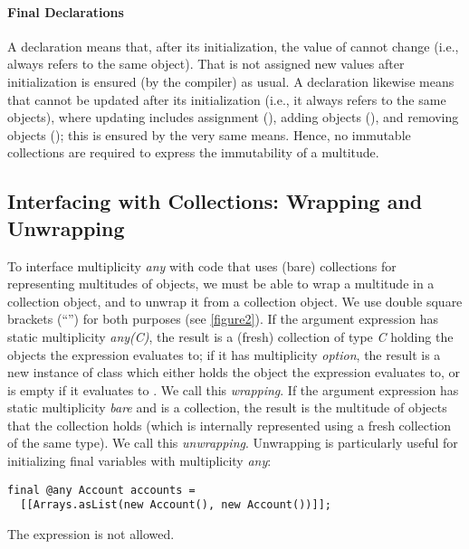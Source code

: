 {\paragraph{Final Declarations} A declaration  means that,
after its initialization, the value of  cannot change (i.e.,
 always refers to the same object). That  is not assigned
new values after initialization is ensured (by the compiler) as usual. A
declaration  likewise means that  cannot be
updated after its initialization (i.e., it always refers to the same
objects), where updating includes assignment (\inline{=}), adding objects (\inline{+=}), and
removing objects (\inline{-=}); this is ensured by the very same means. Hence,
no immutable collections are required to express the immutability of a
multitude.

\subsection{Interfacing with Collections: Wrapping and Unwrapping}
\label{section4.3}

\noindent To interface multiplicity \emph{any} with code that uses
(bare) collections for representing multitudes of objects, we must be able
to wrap a multitude in a collection object, and to unwrap it from a
collection object. We use double square brackets (``\inline{[[$\something$]]}'') for both purposes
(see \autoref{figure2}). If the argument expression has static multiplicity
\emph{any(C)}, the result is a (fresh) collection of type
\emph{C} holding the objects the expression evaluates to; if it has
multiplicity \emph{option}, the result is a new instance of class
 which either holds the object the expression evaluates to,
or is empty if it evaluates to . We call this
\emph{wrapping}. If the argument expression has static multiplicity
\emph{bare} and is a collection, the result is the multitude of objects
that the collection holds (which is internally represented using a fresh
collection of the same type). We call this \emph{unwrapping}.
Unwrapping is particularly useful for initializing final variables with
multiplicity \emph{any}:

\begin{lstlisting}
final @any Account accounts =
  [[Arrays.asList(new Account(), new Account())]];
\end{lstlisting}

\noindent The expression \inline{[[null]]} is not allowed.

}

